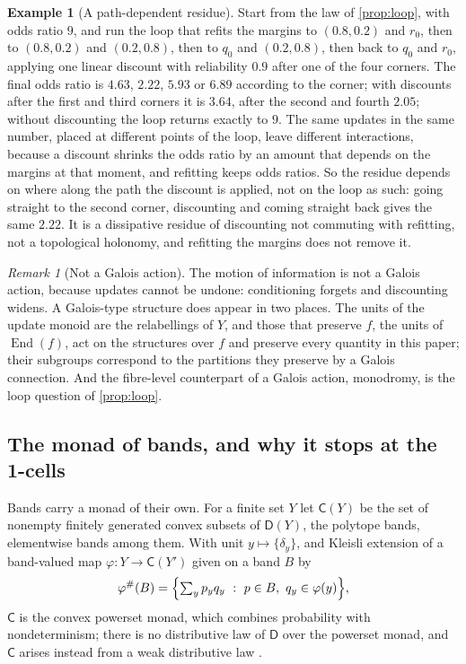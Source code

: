 \documentclass[11pt]{article}
\theoremstyle{definition}
\newtheorem{example}[theorem]{Example}
\theoremstyle{remark}
\newtheorem{remark}[theorem]{Remark}
\newcommand{\D}{\mathsf{D}}
\begin{document}
\begin{example}[A path-dependent residue]\label{ex:anholonomy}
Start from the law of \cref{prop:loop}, with odds ratio $9$, and run the loop that refits the margins to $(0.8,0.2)$ and $r_0$, then to $(0.8,0.2)$ and
$(0.2,0.8)$, then to $q_0$ and $(0.2,0.8)$, then back to $q_0$ and $r_0$, applying one linear discount with reliability $0.9$ after one of the four
corners. The final odds ratio is $4.63$, $2.22$, $5.93$ or $6.89$ according to the corner; with discounts after the first and third corners it is
$3.64$, after the second and fourth $2.05$; without discounting the loop returns exactly to $9$. The same updates in the same number, placed at
different points of the loop, leave different interactions, because a discount shrinks the odds ratio by an amount that depends on the
margins at that moment, and refitting keeps odds ratios. So the residue depends on where along the path the discount is applied, not on
the loop as such: going straight to the second corner, discounting and coming straight back gives the same $2.22$. It is a dissipative
residue of discounting not commuting with refitting, not a topological holonomy, and refitting the margins does not remove it.
\end{example}

\begin{remark}[Not a Galois action]\label{rem:galois}
The motion of information is not a Galois action, because updates cannot be undone: conditioning forgets and discounting
widens. A Galois-type structure does appear in two places. The units of the update monoid are the relabellings of $Y$, and those that preserve $f$,
the units of $\operatorname{End}(f)$, act on the structures over $f$ and preserve every quantity in this paper; their subgroups
correspond to the partitions they preserve by a Galois connection. And the fibre-level counterpart of a Galois action, monodromy, is the loop question of
\cref{prop:loop}.
\end{remark}

\subsection{The monad of bands, and why it stops at the 1-cells}

Bands carry a monad of their own. For a finite set $Y$ let $\mathsf C(Y)$ be the set of nonempty finitely generated convex subsets of $\D(Y)$,
the polytope bands, elementwise bands among them. With unit $y\mapsto\{\delta_y\}$, and Kleisli extension of a band-valued map
$\varphi\colon Y\to\mathsf C(Y')$ given on a band $B$ by
\[
\varphi^\#(B)=\Bigl\{\textstyle\sum_yp_yq_y\ :\ p\in B,\ q_y\in\varphi(y)\Bigr\},
\]
$\mathsf C$ is the convex powerset monad, which combines probability with nondeterminism; there is no distributive law of $\D$ over the
powerset monad, and $\mathsf C$ arises instead from a weak distributive law \cite{VaraccaWinskel2006,Jacobs2008,GoyPetrisan2020}.
\end{document}
